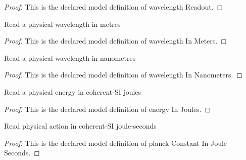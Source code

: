 \begin{proof}
  This is the declared model definition of wavelength Readout.
\end{proof}
\begin{definition}
  \label{def:physics:phyx-mini-0578:phyxminiproblems-problemphyxmini0578-wavelengthinmeters}
  Read a physical wavelength in metres
\end{definition}
\begin{proof}
  This is the declared model definition of wavelength In Meters.
\end{proof}
\begin{definition}
  \label{def:physics:phyx-mini-0578:phyxminiproblems-problemphyxmini0578-wavelengthinnanometers}
  Read a physical wavelength in nanometres
\end{definition}
\begin{proof}
  This is the declared model definition of wavelength In Nanometers.
\end{proof}
\begin{definition}
  \label{def:physics:phyx-mini-0578:phyxminiproblems-problemphyxmini0578-energyinjoules}
  Read a physical energy in coherent-SI joules
\end{definition}
\begin{proof}
  This is the declared model definition of energy In Joules.
\end{proof}
\begin{definition}
  \label{def:physics:phyx-mini-0578:phyxminiproblems-problemphyxmini0578-planckconstantinjouleseconds}
  Read physical action in coherent-SI joule-seconds
\end{definition}
\begin{proof}
  This is the declared model definition of planck Constant In Joule Seconds.
\end{proof}
